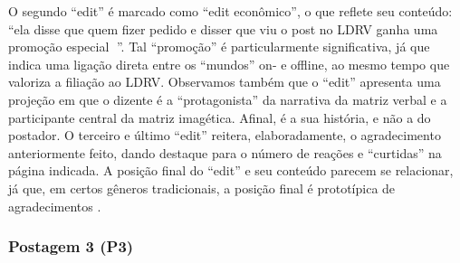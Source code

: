 \documentclass{textolivre-html}
\begin{document}
O segundo “edit” é marcado como “edit econômico”, o que reflete seu conteúdo: “ela disse que quem fizer pedido e disser que viu o post no LDRV ganha uma promoção especial {\Symbola 💖}”. Tal “promoção” é particularmente significativa, já que indica uma ligação direta entre os “mundos” on- e offline, ao mesmo tempo que valoriza a filiação ao LDRV. Observamos também que o “edit” apresenta uma projeção em que o dizente é a “protagonista” da narrativa da matriz verbal e a participante central da matriz imagética. Afinal, é a sua história, e não a do postador. O terceiro e último “edit” reitera, elaboradamente, o agradecimento anteriormente feito, dando destaque para o número de reações e “curtidas” na página indicada. A posição final do “edit” e seu conteúdo parecem se relacionar, já que, em certos gêneros tradicionais, a posição final é prototípica de agradecimentos \cite{henry2001}.

\subsubsection{Postagem 3 (P3)}\label{sec-postagem3}
\end{document}

